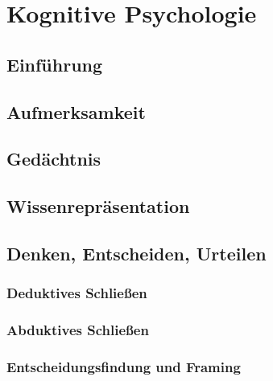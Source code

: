     \section{Kognitive Psychologie} %

        \subsection{Einführung} %

        \subsection{Aufmerksamkeit} %

        \subsection{Gedächtnis} %

        \subsection{Wissenrepräsentation} %

        \subsection{Denken, Entscheiden, Urteilen} %

            \subsubsection{Deduktives Schließen} %

            \subsubsection{Abduktives Schließen} %

            \subsubsection{Entscheidungsfindung und Framing} %

